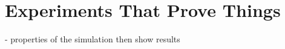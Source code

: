 
\def\chapdir{./ChapterExperiments}

\chapter{Experiments That Prove Things}\label{ch:experiments}
- properties of the simulation then show results














